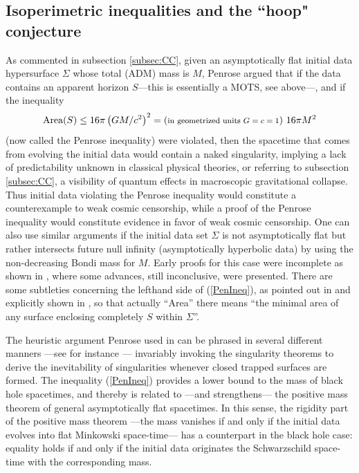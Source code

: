 \documentclass[12pt]{iopart}
\def\be{\begin{equation}}
\def\ee{\end{equation}}
\begin{document}
\subsection{Isoperimetric inequalities and the ``hoop" conjecture}\label{subsec:ineq}
As commented in subsection \ref{subsec:CC}, given an asymptotically flat initial data hypersurface $\Sigma$ whose total (ADM) mass is $M$, Penrose argued \cite{PI} that if the data contains an apparent horizon $S$---this is essentially a MOTS, see above---, and if the inequality 
\be
\mbox{Area}(S) \leq 16 \pi \left(GM/c^{2}\right)^{2}= \mbox{({\footnotesize in geometrized units $G=c=1$}) } 16\pi M^2 \label{PenIneq}
\ee
(now called the Penrose inequality) were violated, then the spacetime that comes from evolving the initial data would contain a naked singularity, implying a lack of predictability unknown in classical physical theories, or referring to subsection \ref{subsec:CC}, a visibility of quantum effects in macroscopic gravitational collapse. Thus initial data violating the Penrose inequality would constitute a counterexample to weak cosmic censorship, while a proof of the Penrose inequality would constitute evidence in favor of weak cosmic censorship. One can also use similar arguments if the initial data set $\Sigma$ is not asymptotically flat but rather intersects future null infinity (asymptotically hyperbolic data) by using the non-decreasing \cite{Bondi,Sa} Bondi mass for $M$. Early proofs for this case \cite{LV} were incomplete as shown in \cite{Berg}, where some advances, still inconclusive, were presented. There are some subtleties concerning the lefthand side of (\ref{PenIneq}), as pointed out in \cite{JW} and explicitly shown in \cite{Horo,Bendov}, so that actually ``Area'' there means ``the minimal area of any surface enclosing completely $S$ within $\Sigma$''. 

The heuristic argument Penrose used in \cite{PI} can be phrased in several different manners ---see for instance \cite{Mars,Malec,JVG}--- invariably invoking the singularity theorems to derive the inevitability of singularities whenever closed trapped surfaces are formed. The inequality (\ref{PenIneq}) provides a lower bound to the mass of black hole spacetimes, and thereby is related to ---and strengthens--- the positive mass theorem \cite{SY1,SY2} of general asymptotically flat spacetimes. In this sense, the rigidity part of the positive mass theorem ---the mass vanishes if and only if the initial data evolves into flat Minkowski space-time--- has a counterpart in the black hole case: equality holds if and only if the initial data originates the Schwarzschild space-time with the corresponding mass.
\end{document}
